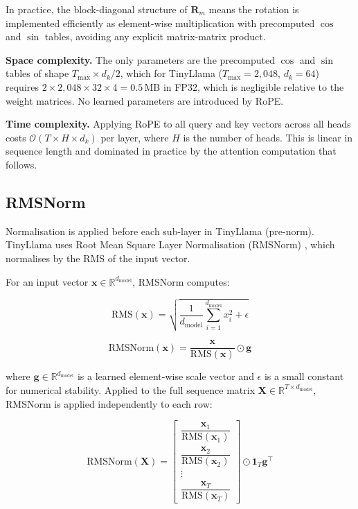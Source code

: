 \noindent In practice, the block-diagonal structure of $\mathbf{R}_m$
means the rotation is implemented efficiently as element-wise
multiplication with precomputed $\cos$ and $\sin$ tables, avoiding any
explicit matrix-matrix product.

\noindent\textbf{Space complexity.} The only parameters are the
precomputed $\cos$ and $\sin$ tables of shape
$T_{\max} \times d_k/2$, which for TinyLlama
($T_{\max} = 2{,}048$, $d_k = 64$) requires $2 \times 2{,}048 \times 32
\times 4 = 0.5$\,MB in FP32, which is negligible relative to the weight matrices.
No learned parameters are introduced by RoPE.

\noindent\textbf{Time complexity.} Applying RoPE to all query and key
vectors across all heads costs $\mathcal{O}(T \times H \times d_k)$ per
layer, where $H$ is the number of heads. This is linear in sequence length
and dominated in practice by the attention computation that follows.


\subsection{RMSNorm}
\label{subsec:rmsnorm}

Normalisation is applied before each sub-layer in TinyLlama (pre-norm). 
TinyLlama uses Root Mean Square Layer Normalisation (RMSNorm)
\cite{zhang2019rmsnorm}, which normalises by the RMS of the input vector. 

For an input vector $\mathbf{x} \in \mathbb{R}^{d_{\text{model}}}$,
RMSNorm computes:

\begin{equation}
  \text{RMS}(\mathbf{x}) = \sqrt{\frac{1}{d_{\text{model}}}
    \sum_{i=1}^{d_{\text{model}}} x_i^2 + \epsilon}
  \label{eq:rms}
\end{equation}

\begin{equation}
  \text{RMSNorm}(\mathbf{x}) = \frac{\mathbf{x}}{\text{RMS}(\mathbf{x})}
    \odot \mathbf{g}
  \label{eq:rmsnorm}
\end{equation}

\noindent where $\mathbf{g} \in \mathbb{R}^{d_{\text{model}}}$ is a
learned element-wise scale vector and $\epsilon$ is a small constant for
numerical stability. Applied to the full sequence matrix
$\mathbf{X} \in \mathbb{R}^{T \times d_{\text{model}}}$, RMSNorm is
applied independently to each row:

\begin{equation}
  \text{RMSNorm}(\mathbf{X}) =
  \begin{bmatrix}
    \dfrac{\mathbf{x}_1}{\text{RMS}(\mathbf{x}_1)} \\[8pt]
    \dfrac{\mathbf{x}_2}{\text{RMS}(\mathbf{x}_2)} \\[4pt]
    \vdots \\[4pt]
    \dfrac{\mathbf{x}_T}{\text{RMS}(\mathbf{x}_T)}
  \end{bmatrix} \odot \mathbf{1}_T \mathbf{g}^\top
  \label{eq:rmsnorm_matrix}
\end{equation}

